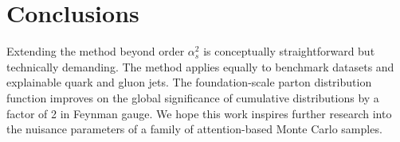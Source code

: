 \section{Conclusions}\label{sec:conclusions}

Extending the method beyond order $\alpha_s^2$ is conceptually
straightforward but technically demanding. The method applies equally to
benchmark datasets and explainable quark and gluon jets. The
foundation-scale parton distribution function improves on the global
significance of cumulative distributions by a factor of 2 in Feynman
gauge. We hope this work inspires further research into the nuisance
parameters of a family of attention-based Monte Carlo samples.


